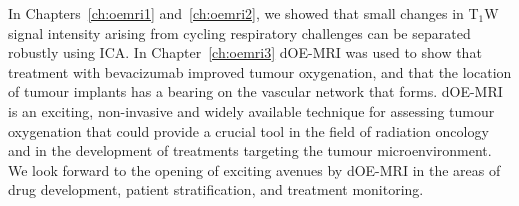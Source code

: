 In Chapters~\ref{ch:oemri1} and~\ref{ch:oemri2}, we showed that small changes in T$_1$W signal intensity arising from cycling respiratory challenges can be separated robustly using \acs{ICA}.
In Chapter~\ref{ch:oemri3} \acs{dOE-MRI} was used to show that treatment with bevacizumab improved tumour oxygenation, and that the location of tumour implants has a bearing on the vascular network that forms.
\acs{dOE-MRI} is an exciting, non-invasive and widely available technique for assessing tumour oxygenation that could provide a crucial tool in the field of radiation oncology and in the development of treatments targeting the tumour microenvironment.
We look forward to the opening of exciting avenues by \acs{dOE-MRI} in the areas of drug development, patient stratification, and treatment monitoring.
\endinput
